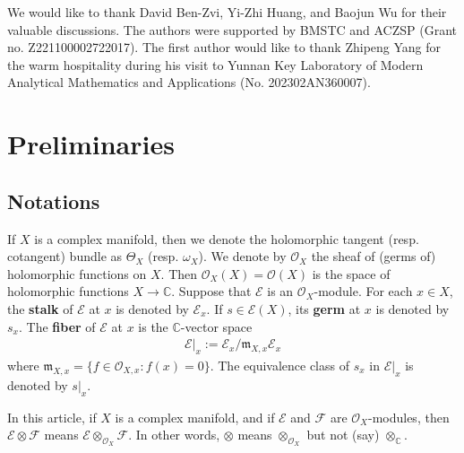 \documentclass[11pt,b5paper,notitlepage]{article}
\theoremstyle{definition}
\theoremstyle{plain}
\newcommand{\mc}{\mathcal}
\newcommand{\scr}{\mathscr}
\newcommand{\Cbb}{\mathbb C}
\newcommand{\<}{\left\langle}
\renewcommand{\>}{\right\rangle}
\newcommand{\mk}{\mathfrak m}
\numberwithin{equation}{subsection}
\begin{document}
We would like to thank David Ben-Zvi, Yi-Zhi Huang, and Baojun Wu for their valuable discussions. The authors were supported by BMSTC and ACZSP (Grant no. Z221100002722017). The first author would like to thank Zhipeng Yang for the warm hospitality during his visit to Yunnan Key Laboratory of Modern Analytical Mathematics and Applications (No. 202302AN360007).







































\section{Preliminaries}

\subsection{Notations}

If $X$ is a complex manifold, then we denote the holomorphic tangent (resp. cotangent) bundle as $\Theta_X$ (resp. $\omega_X$). We denote by $\mc O_X$ the sheaf of (germs of) holomorphic functions on $X$. Then $\mc O_X(X)=\mc O(X)$ is the space of holomorphic functions $X\rightarrow\Cbb$. Suppose that $\scr E$ is an $\mc O_X$-module. For each $x\in X$, the \textbf{stalk} of $\scr E$ at $x$ is denoted by $\scr E_x$. If $s\in\scr E(X)$, its \textbf{germ} at $x$ is denoted by $s_x$. The \textbf{fiber} of $\scr E$ at $x$ is the $\Cbb$-vector space
\begin{align}
\scr E|_x:=\scr E_x/\mk_{X,x}\scr E_x
\end{align}  
where $\mk_{X,x}=\{f\in\mc O_{X,x}:f(x)=0\}$. The equivalence class of $s_x$ in $\scr E|_x$ is denoted by $s|_x$.


In this article, if $X$ is a complex manifold, and if $\scr E$ and $\scr F$ are $\mc O_X$-modules, then $\scr E\otimes\scr F$ means $\scr E\otimes_{\mc O_X}\scr F$. In other words, $\otimes$ means $\otimes_{\mc O_X}$ but not (say) $\otimes_\Cbb$.
\end{document}
